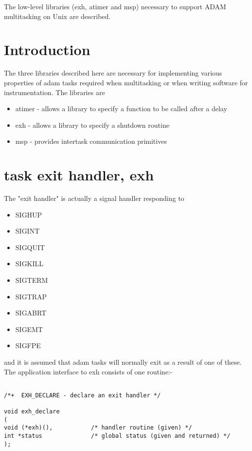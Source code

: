 The low-level libraries (exh, atimer and msp) necessary to support ADAM
multitasking on Unix are described.


\section {Introduction}

The three libraries described here are necessary for implementing various
properties of adam tasks required when multitasking or when writing
software for instrumentation. The libraries are

\begin{itemize}
\item atimer - allows a library to specify a function to be called after a delay
\item exh - allows a library to specify a shutdown routine
\item msp - provides intertask communication primitives
\end{itemize}


\section {task exit handler, exh}

The "exit handler" is actually a signal handler responding to

\begin{itemize}
\item SIGHUP
\item SIGINT
\item SIGQUIT
\item SIGKILL
\item SIGTERM
\item SIGTRAP
\item SIGABRT
\item SIGEMT
\item SIGFPE
\end{itemize}

and it is assumed that adam tasks will normally exit as a result of one of
these. The application interface to exh consists of one routine:-
\begin{verbatim}

/*+  EXH_DECLARE - declare an exit handler */

void exh_declare
(
void (*exh)(),           /* handler routine (given) */
int *status              /* global status (given and returned) */
);

\end{verbatim}

